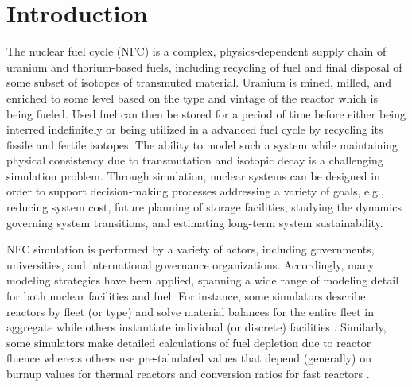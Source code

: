 \section{Introduction}

The nuclear fuel cycle (NFC) is a complex, physics-dependent supply chain of
uranium and thorium-based fuels, including recycling of fuel and final disposal
of some subset of isotopes of transmuted material. Uranium is mined, milled, and
enriched to some level based on the type and vintage of the reactor
which is being fueled. Used fuel can then be stored for a period of time before
either being interred indefinitely or being utilized in a advanced fuel cycle by
recycling its fissile and fertile isotopes. The ability to model such a system
while maintaining physical consistency due to transmutation and isotopic decay
is a challenging simulation problem. Through simulation, nuclear systems can be
designed in order to support decision-making processes addressing a variety of
goals, e.g., reducing system cost, future planning of storage facilities,
studying the dynamics governing system transitions, and estimating long-term
system sustainability.

NFC simulation is performed by a variety of actors, including governments,
universities, and international governance organizations. Accordingly, many
modeling strategies have been applied, spanning a wide range of modeling detail
for both nuclear facilities and fuel. For instance, some simulators describe
reactors by fleet (or type) and solve material balances for the entire fleet in
aggregate \cite{busquim_e_silva_system_2008, durpel_daness_2003,
  yacout_vision_2006} while others instantiate individual (or discrete)
facilities \cite{schneider_nfcsim:_2005}. Similarly, some simulators make
detailed calculations of fuel depletion due to reactor fluence
\cite{boucher_cosi:_2006, mouginot2012class} whereas others use pre-tabulated
values that depend (generally) on burnup values for thermal reactors and
conversion ratios for fast reactors \cite{yacout_vision_2006}.


